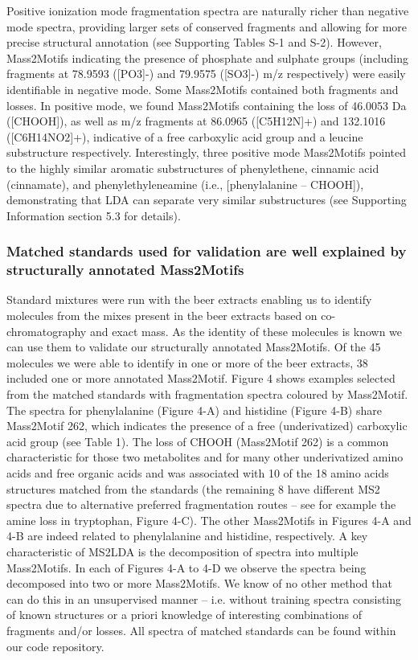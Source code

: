 Positive ionization mode fragmentation spectra are naturally richer than negative mode spectra, providing larger sets of conserved fragments and allowing for more precise structural annotation (see Supporting Tables S-1 and S-2). However, Mass2Motifs indicating the presence of phosphate and sulphate groups (including fragments at 78.9593 ([PO3]-) and 79.9575 ([SO3]-) m/z respectively) were easily identifiable in negative mode. Some Mass2Motifs contained both fragments and losses. In positive mode, we found Mass2Motifs containing the loss of 46.0053 Da ([CHOOH]), as well as m/z fragments at 86.0965 ([C5H12N]+) and 132.1016 ([C6H14NO2]+), indicative of a free carboxylic acid group and a leucine substructure respectively. Interestingly, three positive mode Mass2Motifs pointed to the highly similar aromatic substructures of phenylethene, cinnamic acid (cinnamate), and phenylethyleneamine (i.e., [phenylalanine – CHOOH]), demonstrating that LDA can separate very similar substructures (see Supporting Information section 5.3 for details).

\subsubsection{Matched standards used for validation are well explained by structurally annotated Mass2Motifs}

Standard mixtures were run with the beer extracts enabling us to identify molecules from the mixes present in the beer extracts based on co-chromatography and exact mass. As the identity of these molecules is known we can use them to validate our structurally annotated Mass2Motifs. Of the 45 molecules we were able to identify in one or more of the beer extracts, 38 included one or more annotated Mass2Motif. 
Figure 4 shows examples selected from the matched standards with fragmentation spectra coloured by Mass2Motif. The spectra for phenylalanine (Figure 4-A) and histidine (Figure 4-B) share Mass2Motif 262, which indicates the presence of a free (underivatized) carboxylic acid group (see Table 1). The loss of CHOOH (Mass2Motif 262) is a common characteristic for those two metabolites and for many other underivatized amino acids and free organic acids and was associated with 10 of the 18 amino acids structures matched from the standards (the remaining 8 have different MS2 spectra due to alternative preferred fragmentation routes – see for example the amine loss in tryptophan, Figure 4-C). The other Mass2Motifs in Figures 4-A and 4-B are indeed related to phenylalanine and histidine, respectively. A key characteristic of MS2LDA is the decomposition of spectra into multiple Mass2Motifs. In each of Figures 4-A to 4-D we observe the spectra being decomposed into two or more Mass2Motifs. We know of no other method that can do this in an unsupervised manner – i.e. without training spectra consisting of known structures or a priori knowledge of interesting combinations of fragments and/or losses. All spectra of matched standards can be found within our code repository. 

